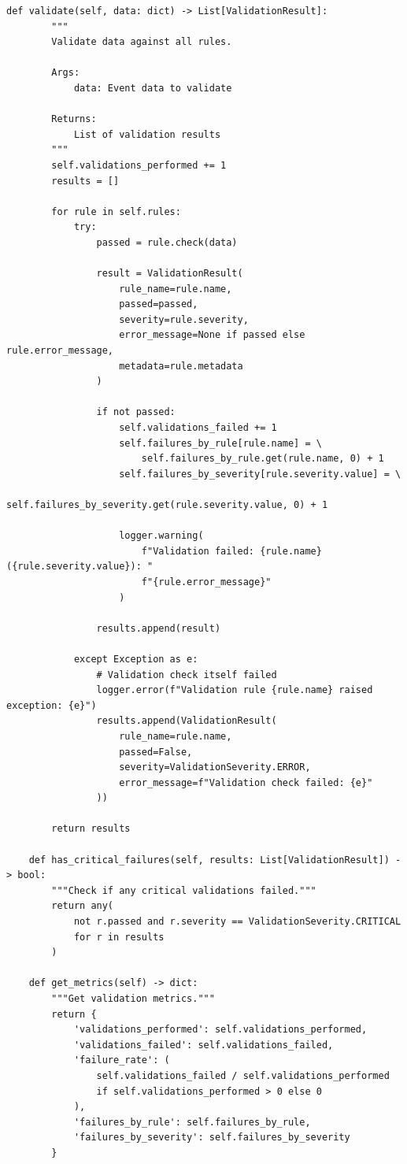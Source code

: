 \begin{lstlisting}[style=python, caption={Quality Validation Rules}]
    def validate(self, data: dict) -> List[ValidationResult]:
        """
        Validate data against all rules.

        Args:
            data: Event data to validate

        Returns:
            List of validation results
        """
        self.validations_performed += 1
        results = []

        for rule in self.rules:
            try:
                passed = rule.check(data)

                result = ValidationResult(
                    rule_name=rule.name,
                    passed=passed,
                    severity=rule.severity,
                    error_message=None if passed else rule.error_message,
                    metadata=rule.metadata
                )

                if not passed:
                    self.validations_failed += 1
                    self.failures_by_rule[rule.name] = \
                        self.failures_by_rule.get(rule.name, 0) + 1
                    self.failures_by_severity[rule.severity.value] = \
                        self.failures_by_severity.get(rule.severity.value, 0) + 1

                    logger.warning(
                        f"Validation failed: {rule.name} ({rule.severity.value}): "
                        f"{rule.error_message}"
                    )

                results.append(result)

            except Exception as e:
                # Validation check itself failed
                logger.error(f"Validation rule {rule.name} raised exception: {e}")
                results.append(ValidationResult(
                    rule_name=rule.name,
                    passed=False,
                    severity=ValidationSeverity.ERROR,
                    error_message=f"Validation check failed: {e}"
                ))

        return results

    def has_critical_failures(self, results: List[ValidationResult]) -> bool:
        """Check if any critical validations failed."""
        return any(
            not r.passed and r.severity == ValidationSeverity.CRITICAL
            for r in results
        )

    def get_metrics(self) -> dict:
        """Get validation metrics."""
        return {
            'validations_performed': self.validations_performed,
            'validations_failed': self.validations_failed,
            'failure_rate': (
                self.validations_failed / self.validations_performed
                if self.validations_performed > 0 else 0
            ),
            'failures_by_rule': self.failures_by_rule,
            'failures_by_severity': self.failures_by_severity
        }


\end{lstlisting}
